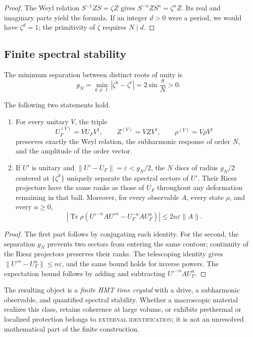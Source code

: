 \begin{proof}
The Weyl relation \(S^{-1} Z S=\zeta Z\) gives
\(S^{-n} Z S^n=\zeta^n Z\). Its real and imaginary parts yield the
formula. If an integer \(d>0\) were a period, we would have
\(\zeta^d=1\); the primitivity of \(\zeta\) requires \(N\mid d\).
\end{proof}

\subsection{Finite spectral stability}

The minimum separation between distinct roots of unity is
\[
 g_N=\min_{k\ne\ell}|\zeta^k-\zeta^\ell|
 =2\sin\frac{\pi}{N}>0.
\]

\begin{theorem}
\label{thm:hmtf2-estabilidad-cristal}
The following two statements hold.

\begin{enumerate}
 \item For every unitary \(V\), the triple
 \[
  U_F^{(V)}=V U_F V^\dagger,\qquad
  Z^{(V)}=V Z V^\dagger,\qquad
  \rho^{(V)}=V\rho V^\dagger
 \]
 preserves exactly the Weyl relation, the subharmonic response of order \(N\), and
 the amplitude of the order vector.
 \item If \(U'\) is unitary and
 \(\|U'-U_F\|=\varepsilon<g_N/2\), the \(N\) discs of radius
 \(g_N/2\) centered at \(\{\zeta^k\}\) uniquely separate the
 spectral sectors of \(U'\). Their Riesz projectors have the same ranks as
 those of \(U_F\) throughout any deformation remaining in that ball.
 Moreover, for every observable \(A\), every state \(\rho\), and every \(n\geq0\),
 \[
 \left|
 \operatorname{Tr}\rho\left(U'^{-n}AU'^n-U_F^{-n}AU_F^n\right)
 \right|
 \leq 2n\varepsilon\|A\|.
 \]
\end{enumerate}
\end{theorem}

\begin{proof}
The first part follows by conjugating each identity. For the second,
the separation \(g_N\) prevents two sectors from entering the same contour;
continuity of the Riesz projectors preserves their ranks. The telescoping
identity gives
\(\|U'^n-U_F^n\|\leq n\varepsilon\), and the same bound holds for
inverse powers. The expectation bound follows by adding and
subtracting \(U'^{-n}AU_F^n\).
\end{proof}

The resulting object is a \emph{finite HMT time crystal} with a drive,
a subharmonic observable, and quantified spectral stability. Whether a
macroscopic material realizes this class, retains coherence at large volume, or
exhibits prethermal or localized protection belongs to
\textsc{external identification}; it is not an unresolved mathematical part of the
finite construction.
